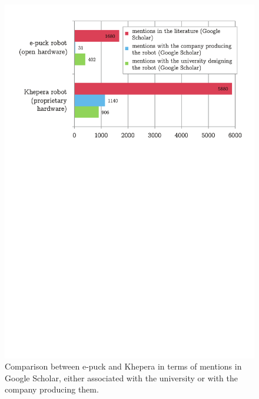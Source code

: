 \documentclass[letterpaper, 10 pt, conference]{ieeeconf}  %
\begin{document}
\begin{figure}
\centering
\includegraphics[width=\columnwidth]{figures/others_robots}
\caption{Comparison between e-puck and Khepera in terms of mentions in Google Scholar, either associated with the university or with the company producing them.
}
\label{fig:khepuck}
\end{figure}
\end{document}
